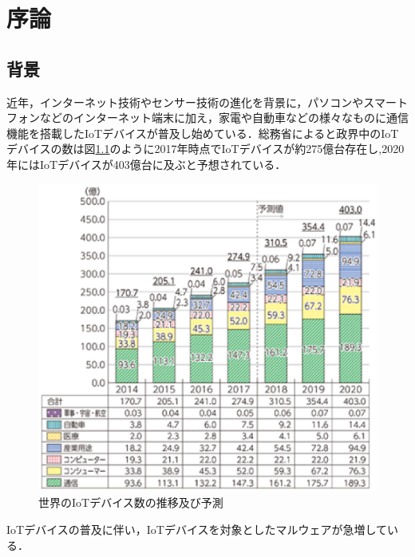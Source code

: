 \chapter{序論} %


\section{背景} %


近年，インターネット技術やセンサー技術の進化を背景に，パソコンやスマートフォンなどのインターネット端末に加え，家電や自動車などの様々なものに通信機能を搭載したIoTデバイスが普及し始めている．総務省によると政界中のIoTデバイスの数は図\ref{fig:IoT}のように2017年時点でIoTデバイスが約275億台存在し,2020年にはIoTデバイスが403億台に及ぶと予想されている\cite{IoT}．
 \begin{figure}[h]
 \centering
    \includegraphics{figures/IoT_device.eps}
    \caption{世界のIoTデバイス数の推移及び予測}
 \label{fig:IoT}
 \end{figure}
IoTデバイスの普及に伴い，IoTデバイスを対象としたマルウェアが急増している．
